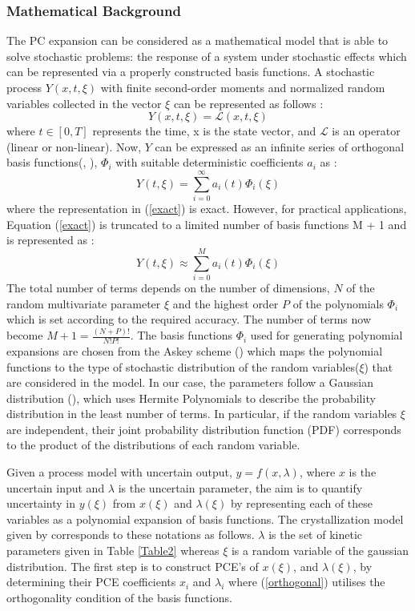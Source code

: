 \documentclass[3p,times,authoryear]{elsarticle}
\begin{document}
\subsubsection{Mathematical Background} \label{mathback}
The PC expansion can be considered as a mathematical model that is able to solve stochastic problems: the response of a system under stochastic effects which can be represented via a properly constructed basis functions. A stochastic process $Y(x,t,\xi)$ with finite second-order moments and normalized random variables collected in the vector $\xi$ can be represented as follows : 
\begin{equation}
Y(x,t,\xi) = \mathcal{L}(x,t,\xi)
\end{equation}
where $t \in [0, T]$ represents the time, x is the state vector, and $\mathcal{L}$ is an operator (linear or non-linear).
Now, $Y$ can be expressed as an infinite series of orthogonal basis functions(\cite{ghanem}, \cite{ghanem1997}), $\Phi_{i}$ with suitable deterministic coefficients $a_{i}$ as :
\begin{equation} \label{exact}
Y(t,\xi) =  \sum_{i=0}^{\infty} a_{i}(t)\Phi_{i}(\xi)
\end{equation}
where the representation in (\ref{exact}) is exact. However, for practical applications, Equation (\ref{exact}) is
truncated to a limited number of basis functions M + 1 and is represented as :
\begin{equation} \label{approx}
Y(t,\xi) \approx \sum_{i=0}^{M} a_{i}(t)\Phi_{i}(\xi)
\end{equation}
The total number of terms depends on the number of dimensions, $N$ of the random multivariate parameter $\xi$ and the highest order $P$ of the polynomials $\Phi_{i}$ which is set according to the required accuracy. The number of terms now become $ M + 1 = \frac{(N+P)!}{N!P!} $. The basis functions $\Phi_{i}$ used for generating polynomial expansions  are chosen from the Askey scheme (\cite{xiuwiener}) which maps the polynomial functions to the type of stochastic distribution of the random variables($\xi$) that are considered in the model. In our case, the parameters follow a Gaussian distribution (\cite{yenkie}), which uses Hermite Polynomials to describe the probability distribution in the least number of terms. In particular, if the random variables $\xi$ are independent, their joint probability distribution function (PDF) corresponds to the product of the distributions of each random variable. 
\par
Given a process model with uncertain output, $y = f(x,\lambda)$, where $x$ is the uncertain input and $\lambda$ is the uncertain parameter, the aim is to quantify uncertainty in $y(\xi)$ from $x(\xi)$ and $\lambda(\xi)$ by representing each of these variables as a polynomial expansion of basis functions. The crystallization model given by  corresponds to these notations as follows. $\lambda$ is the set of kinetic parameters given in Table \ref{Table2} whereas $\xi$ is a random variable of the gaussian distribution. The first step is to construct PCE’s of $x(\xi)$, and $\lambda(\xi)$, by determining their PCE coefficients $x_{i}$ and $\lambda_{i}$ where (\ref{orthogonal}) utilises the orthogonality condition of the basis functions.
\end{document}
